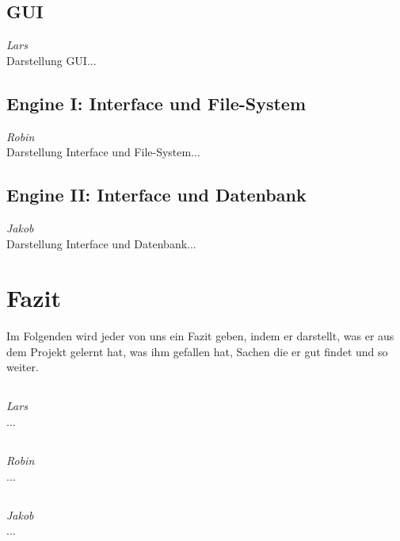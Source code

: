 \documentclass[12pt,a4paper,bibliography=totocnumbered,listof=totocnumbered]{scrartcl}
\begin{document}
\subsection{GUI}
\emph{Lars}\\
Darstellung GUI...

\subsection{Engine I: Interface und File-System}
\emph{Robin}\\
Darstellung Interface und File-System...

\subsection{Engine II: Interface und Datenbank}
\emph{Jakob}\\
Darstellung Interface und Datenbank...
\pagebreak
\section{Fazit}
Im Folgenden wird jeder von uns ein Fazit geben, indem er darstellt, was er aus dem Projekt gelernt hat, was ihm gefallen hat, Sachen die er gut findet und so weiter.

\subsection{}
\emph{Lars}\\
...

\subsection{}
\emph{Robin}\\
...

\subsection{}
\emph{Jakob}\\
...

\pagebreak
\end{document}
